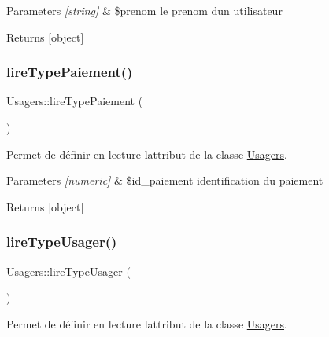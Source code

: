 \begin{DoxyParams}{Parameters}
{\em \mbox{[}string\mbox{]}} & \$prenom le prenom d\textquotesingle{}un utilisateur \\
\hline
\end{DoxyParams}
\begin{DoxyReturn}{Returns}
\mbox{[}object\mbox{]} 
\end{DoxyReturn}
\mbox{\label{class_usagers_a6e9ddd8b6387c964af5c87d0b02cbb1b}} 
\subsubsection{\texorpdfstring{lire\+Type\+Paiement()}{lireTypePaiement()}}
{\footnotesize\ttfamily Usagers\+::lire\+Type\+Paiement (\begin{DoxyParamCaption}{ }\end{DoxyParamCaption})}



Permet de définir en lecture l\textquotesingle{}attribut de la classe \hyperlink{class_usagers}{Usagers}. 


\begin{DoxyParams}{Parameters}
{\em \mbox{[}numeric\mbox{]}} & \$id\+\_\+paiement identification du paiement \\
\hline
\end{DoxyParams}
\begin{DoxyReturn}{Returns}
\mbox{[}object\mbox{]} 
\end{DoxyReturn}
\mbox{\label{class_usagers_a7365fedd045258ade6320c9e04c0773d}} 
\subsubsection{\texorpdfstring{lire\+Type\+Usager()}{lireTypeUsager()}}
{\footnotesize\ttfamily Usagers\+::lire\+Type\+Usager (\begin{DoxyParamCaption}{ }\end{DoxyParamCaption})}



Permet de définir en lecture l\textquotesingle{}attribut de la classe \hyperlink{class_usagers}{Usagers}. 


